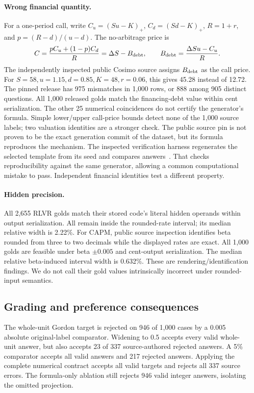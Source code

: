 \paragraph{Wrong financial quantity.} For a one-period call, write $C_u=(Su-K)_+$, $C_d=(Sd-K)_+$, $R=1+r$, and $p=(R-d)/(u-d)$. The no-arbitrage price is
\begin{equation}  C=\frac{pC_u+(1-p)C_d}{R}=\Delta S-B_{\rm debt},\qquad B_{\rm debt}=\frac{\Delta Su-C_u}{R}. \end{equation} The independently inspected public
Cosimo source assigns $B_{\rm debt}$ as the call price. For $S=58,u=1.15,d=0.85,K=48,r=0.06$, this gives 45.28 instead of 12.72. The pinned release has 975 mismatches in 1,000 rows, or 888 among 905 distinct
questions. All 1,000 released golds match the financing-debt value within cent serialization. The other 25 numerical coincidences do not certify the generator's formula. Simple lower/upper call-price bounds detect none of the 1,000 source labels; two valuation identities are a stronger check.
The public source pin is not proven to be the exact generation commit of the dataset, but its formula reproduces the mechanism. The inspected verification harness regenerates the selected template from its seed
and compares answers~\cite{cosimosource}. That checks reproducibility against the same generator, allowing a common computational mistake to pass. Independent financial identities test a different property.

\paragraph{Hidden precision.} All 2,655 RLVR golds match their stored code's literal hidden operands within output serialization. All remain inside the
rounded-rate interval; its median relative width is 2.22\%. For CAPM, public source inspection identifies beta rounded from three to two decimals while the displayed rates are exact. All 1,000 golds are
feasible under beta $\pm0.005$ and cent-output serialization. The median relative beta-induced interval width is 0.632\%. These are rendering/identification findings. We do not call their gold values
intrinsically incorrect under rounded-input semantics.

\subsection{Grading and preference consequences} The whole-unit Gordon target is rejected on 946 of 1,000 cases by a
0.005 absolute original-label comparator. Widening to 0.5 accepts every valid whole-unit answer, but also accepts 23 of 337 source-authored rejected answers. A 5\% comparator accepts all valid answers and 217
rejected answers. Applying the complete numerical contract accepts all valid targets and rejects all 337 source errors. The formula-only ablation still rejects 946 valid integer answers, isolating the omitted
projection.

